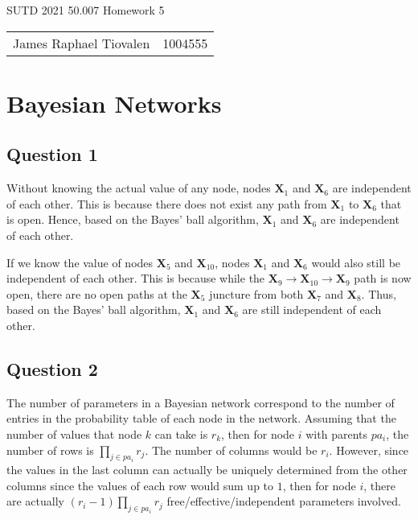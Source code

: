 \documentclass[11pt,fancychapters]{article}
\begin{document}
\centerline{\huge{SUTD 2021 50.007 Homework 5}}

\begin{table}[ht]
\centering
\footnotesize
 \begin{tabular}{c c} 
James Raphael Tiovalen & 1004555
 \end{tabular}
\end{table}

\section*{Bayesian Networks}

\subsection*{Question 1}

Without knowing the actual value of any node, nodes $\mathbf{X}_1$ and $\mathbf{X}_6$ are independent of each other. This is because there does not exist any path from $\mathbf{X}_1$ to $\mathbf{X}_6$ that is open. Hence, based on the Bayes' ball algorithm, $\mathbf{X}_1$ and $\mathbf{X}_6$ are independent of each other.

If we know the value of nodes $\mathbf{X}_5$ and $\mathbf{X}_{10}$, nodes $\mathbf{X}_1$ and $\mathbf{X}_6$ would also still be independent of each other. This is because while the $\mathbf{X}_9 \rightarrow \mathbf{X}_{10} \rightarrow \mathbf{X}_9$ path is now open, there are no open paths at the $\mathbf{X}_5$ juncture from both $\mathbf{X}_7$ and $\mathbf{X}_8$. Thus, based on the Bayes' ball algorithm, $\mathbf{X}_1$ and $\mathbf{X}_6$ are still independent of each other.

\subsection*{Question 2}

The number of parameters in a Bayesian network correspond to the number of entries in the probability table of each node in the network. Assuming that the number of values that node $k$ can take is $r_k$, then for node $i$ with parents $pa_i$, the number of rows is $\prod_{j \in pa_i} r_j$. The number of columns would be $r_i$. However, since the values in the last column can actually be uniquely determined from the other columns since the values of each row would sum up to $1$, then for node $i$, there are actually $(r_i - 1) \prod_{j \in pa_i} r_j$ free/effective/independent parameters involved.
\end{document}
